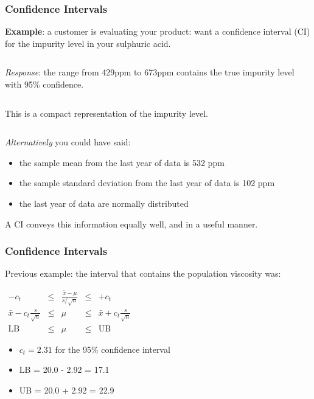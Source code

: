 \begin{frame}\frametitle{Confidence Intervals}

	\textbf{Example}: a customer is evaluating your product: want a confidence interval (CI) for the impurity level in your sulphuric acid.

	$\qquad$

	\emph{Response}: the range from 429ppm to 673ppm contains the true impurity level with 95\% confidence.

	$\qquad$

	This is a compact representation of the impurity level.

	$\qquad$

	\emph{Alternatively} you could have said:
	\begin{itemize}
		\item the sample mean from the last year of data is 532 ppm
		\item the sample standard deviation from the last year of data is 102 ppm
		\item the last year of data are normally distributed
	\end{itemize}

	A CI conveys this information equally well, and in a useful manner.
\end{frame}

\begin{frame}\frametitle{Confidence Intervals}

	Previous example: the interval that contains the population viscosity was:

	$
	\begin{array}{rcccl}
		- c_t &\leq& \displaystyle \frac{\bar{x} - \mu}{s/\sqrt{n}} &\leq& +c_t\\
		\bar{x} - c_t \displaystyle \frac{s}{\sqrt{n}} &\leq& \mu &\leq& \bar{x} + c_t\displaystyle\frac{s}{\sqrt{n}} \\
		\text{LB} &\leq& \mu &\leq& \text{UB}
	\end{array}
	$
	\begin{itemize}
		\item $c_t = 2.31$ for the 95\% confidence interval
		\item LB = 20.0 - 2.92 = 17.1
		\item UB = 20.0 + 2.92 = 22.9
	\end{itemize}
\end{frame}


